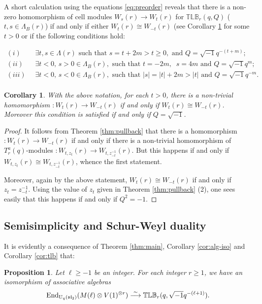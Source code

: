 \documentclass[12pt]{amsart}
\newtheorem{corollary}[theorem]{Corollary}
\newtheorem{proposition}[theorem]{Proposition}
\theoremstyle{definition}
\theoremstyle{remark}
\numberwithin{equation}{section}
\newcommand{\be}{\begin{equation}}
\newcommand{\ee}{\end{equation}}
\newcommand{\inv}{^{-1}}
\newcommand{\lr}{\longrightarrow}
\newcommand{\U}{{\rm{U}}}
\newcommand{\End}{{\rm{End}}}
\newcommand{\fsl}{{\mathfrak {sl}}}
\newcommand{\ot}{\otimes}
\newcommand{\TLBB}{{\mathbb{TLB}}}
\begin{document}
A short calculation using the equations \eqref{eq:preorder} reveals that there is a non-zero homomorphism of cell modules
$W_s(r)\lr W_t(r)$ for $\TLBB_r(q,Q)$ ($t,s\in\Lambda_B(r)$) if and only if either $W_t(r)\cong W_{-t}(r)$ (see Corollary
\ref{cor:cellpm} for some $t>0$ or if the following conditions hold:

\be\label{eq:homs}
\begin{aligned}
(i) \;&\text{$\exists t,s\in\Lambda(r)$ such that }s=t+2m>t\geq 0, \text{ and }Q=\sqrt{-1}q^{-(t+m)};\\
(ii) \;&\text{$\exists t< 0$, }s>0\in\Lambda_B(r), \text{ such that }t=-2m,\;\;s=4m\text{ and }Q=\sqrt{-1}q^{m};\\
(iii) \;\;&\text{$\exists t< 0$, }s<0\in\Lambda_B(r), \text{ such that }|s|= |t|+2m>|t|\text{ and }Q=\sqrt{-1}q^{-m}.\\
\end{aligned}
\ee

\begin{corollary}\label{cor:cellpm}
With the above notation, for each $t>0$, there is a non-trivial homomorphism $:W_t(r)\lr W_{-t}(r)$
  if and only if  $W_t(r)\cong W_{-t}(r)$.
Moreover this condition is satisfied if and only if $Q=\sqrt{-1}$.
\end{corollary}
\begin{proof}
It follows from Theorem \ref{thm:pullback} that there is a homomorphism $:W_t(r)\lr W_{-t}(r)$ if and only
if there is a non-trivial homomorphism of $T^a_r(q)$-modules $:W_{t,z_t}(r)\lr W_{t,z_{-t}\inv}(r)$. But this happens 
if and only if  $W_{t,z_t}(r)\cong W_{t,z_{-t}\inv}(r)$, whence the first statement.

Moreover, again by the above statement, $W_t(r)\cong W_{-t}(r)$ if and only if $z_t=z_{-t}\inv$.
Using the value of $z_t$ given in Theorem \ref{thm:pullback} (2), one sees easily that this happens 
if and only if $Q^2=-1$.
\end{proof}

\subsection{Semisimplicity and Schur-Weyl duality} It is evidently a consequence of Theorem \ref{thm:main}, Corollary \ref{cor:alg-iso}
and  Corollary \ref{cor:tlb} that:

\begin{proposition}\label{prop:end-tlb}
Let $\ell\geq -1$ be an integer. For each integer $r\geq 1$, we have an isomorphism of associative algebras
\[
\End_{\U_q(\fsl_2)}(M(\ell)\ot V(1)^{\ot r})\overset{\sim}{\lr}\TLBB_r(q,\sqrt{-1}q^{-(\ell+1)}).
\]
\end{proposition}
\end{document}
